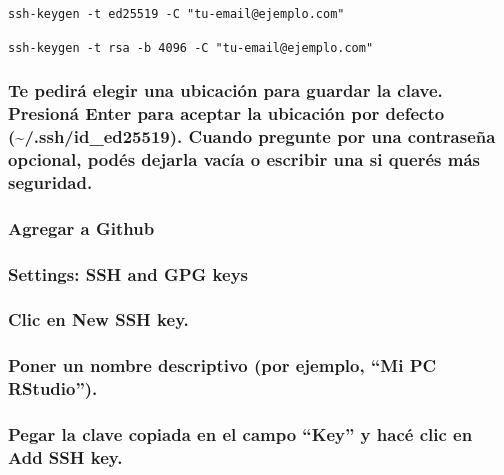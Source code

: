 \documentclass[
]{article}
\begin{document}
\texttt{ssh-keygen\ -t\ ed25519\ -C\ "tu-email@ejemplo.com"}

\texttt{ssh-keygen\ -t\ rsa\ -b\ 4096\ -C\ "tu-email@ejemplo.com"}

\subsubsection{Te pedirá elegir una ubicación para guardar la clave.
Presioná Enter para aceptar la ubicación por defecto
(\textasciitilde/.ssh/id\_ed25519). Cuando pregunte por una contraseña
opcional, podés dejarla vacía o escribir una si querés más
seguridad.}\label{te-pediruxe1-elegir-una-ubicaciuxf3n-para-guardar-la-clave.-presionuxe1-enter-para-aceptar-la-ubicaciuxf3n-por-defecto-.sshid_ed25519.-cuando-pregunte-por-una-contraseuxf1a-opcional-poduxe9s-dejarla-vacuxeda-o-escribir-una-si-queruxe9s-muxe1s-seguridad.}

\subsubsection{Agregar a Github}\label{agregar-a-github}

\subsubsection{Settings: SSH and GPG
keys}\label{settings-ssh-and-gpg-keys}

\subsubsection{Clic en New SSH key.}\label{clic-en-new-ssh-key.}

\subsubsection{Poner un nombre descriptivo (por ejemplo, ``Mi PC
RStudio'').}\label{poner-un-nombre-descriptivo-por-ejemplo-mi-pc-rstudio.}

\subsubsection{Pegar la clave copiada en el campo ``Key'' y hacé clic en
Add SSH
key.}\label{pegar-la-clave-copiada-en-el-campo-key-y-hacuxe9-clic-en-add-ssh-key.}
\end{document}
